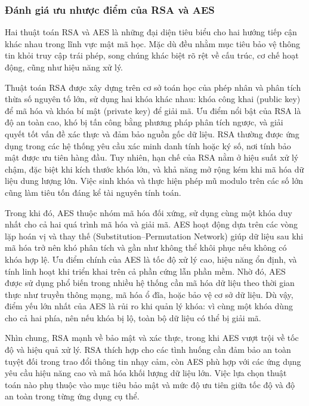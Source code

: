 \subsubsection{Đánh giá ưu nhược điểm của RSA và AES}
\indent Hai thuật toán RSA và AES là những đại diện tiêu biểu cho hai hướng tiếp cận khác nhau trong lĩnh vực mật mã học. Mặc dù đều nhằm mục tiêu bảo vệ thông tin khỏi truy cập trái phép, song chúng khác biệt rõ rệt về cấu trúc, cơ chế hoạt động, cũng như hiệu năng xử lý.

\indent Thuật toán RSA được xây dựng trên cơ sở toán học của phép nhân và phân tích thừa số nguyên tố lớn, sử dụng hai khóa khác nhau: khóa công khai (public key) để mã hóa và khóa bí mật (private key) để giải mã. Ưu điểm nổi bật của RSA là độ an toàn cao, khó bị tấn công bằng phương pháp phân tích ngược, và giải quyết tốt vấn đề xác thực và đảm bảo nguồn gốc dữ liệu. RSA thường được ứng dụng trong các hệ thống yêu cầu xác minh danh tính hoặc ký số, nơi tính bảo mật được ưu tiên hàng đầu. Tuy nhiên, hạn chế của RSA nằm ở hiệu suất xử lý chậm, đặc biệt khi kích thước khóa lớn, và khả năng mở rộng kém khi mã hóa dữ liệu dung lượng lớn. Việc sinh khóa và thực hiện phép mũ modulo trên các số lớn cũng làm tiêu tốn đáng kể tài nguyên tính toán.

\indent Trong khi đó, AES thuộc nhóm mã hóa đối xứng, sử dụng cùng một khóa duy nhất cho cả hai quá trình mã hóa và giải mã. AES hoạt động dựa trên các vòng lặp hoán vị và thay thế (Substitution–Permutation Network) giúp dữ liệu sau khi mã hóa trở nên khó phân tích và gần như không thể khôi phục nếu không có khóa hợp lệ. Ưu điểm chính của AES là tốc độ xử lý cao, hiệu năng ổn định, và tính linh hoạt khi triển khai trên cả phần cứng lẫn phần mềm. Nhờ đó, AES được sử dụng phổ biến trong nhiều hệ thống cần mã hóa dữ liệu theo thời gian thực như truyền thông mạng, mã hóa ổ đĩa, hoặc bảo vệ cơ sở dữ liệu. Dù vậy, điểm yếu lớn nhất của AES là rủi ro khi quản lý khóa: vì cùng một khóa dùng cho cả hai phía, nên nếu khóa bị lộ, toàn bộ dữ liệu có thể bị giải mã.

\indent Nhìn chung, RSA mạnh về bảo mật và xác thực, trong khi AES vượt trội về tốc độ và hiệu quả xử lý. RSA thích hợp cho các tình huống cần đảm bảo an toàn tuyệt đối trong trao đổi thông tin nhạy cảm, còn AES phù hợp với các ứng dụng yêu cầu hiệu năng cao và mã hóa khối lượng dữ liệu lớn. Việc lựa chọn thuật toán nào phụ thuộc vào mục tiêu bảo mật và mức độ ưu tiên giữa tốc độ và độ an toàn trong từng ứng dụng cụ thể.
